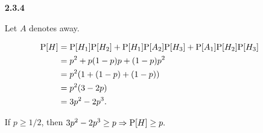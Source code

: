 \documentclass{article}
\begin{document}
\begin{enumerate}
    \item [\textbf{2.3.4}]

    Let $A$ denotes away.

    \begin{align*}
        \mbox P[H]
            & = \mbox P[H_1] \mbox P[H_2] + \mbox P[H_1] \mbox P[A_2] \mbox P[H_3] + \mbox P[A_1] \mbox P[H_2] \mbox P[H_3] \\
            & = p^2 + p(1 - p)p + (1 - p)p^2 \\
            & = p^2(1 + (1 - p) + (1 - p)) \\
            & = p^2(3 - 2p) \\
            & = 3p^2 - 2p^3.
    \end{align*}

    If $p \ge 1 / 2$, then $3p^2 - 2p^3 \ge p \Rightarrow \mbox P[H] \ge p.$ 

\end{enumerate}
\end{document}
